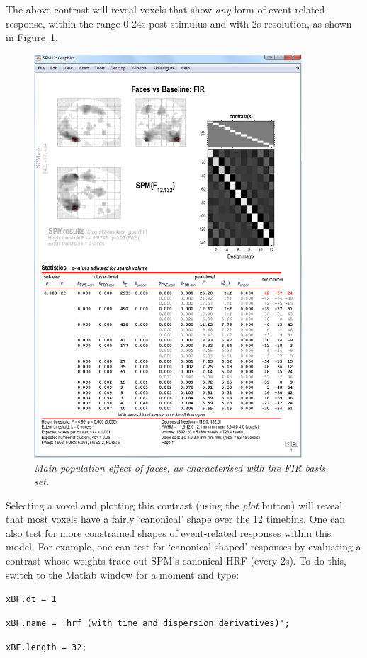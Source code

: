 The above contrast will reveal voxels that show {\em any} form of event-related response, within the range 0-24s post-stimulus and with 2s resolution, as shown in Figure~\ref{fir_results}. 
\begin{figure}
\begin{center}
\includegraphics[width=100mm]{faces_group/fir_results}
\caption{\em Main population effect of faces, as characterised with the FIR basis set. \label{fir_results}}
\end{center}
\end{figure}
Selecting a voxel and plotting this contrast (using the {\em plot} button) will reveal that most voxels have a fairly `canonical' shape over the 12 timebins.
One can also test for more constrained shapes of event-related responses within this model. For example, one can test for `canonical-shaped' responses by evaluating a contrast whose weights trace out SPM's canonical HRF (every 2s). To do this, switch to the Matlab window for a moment and type:
\bi
\item{\verb!xBF.dt = 1!}
\item{\verb!xBF.name = 'hrf (with time and dispersion derivatives)';!}
\item{\verb!xBF.length = 32;!}
